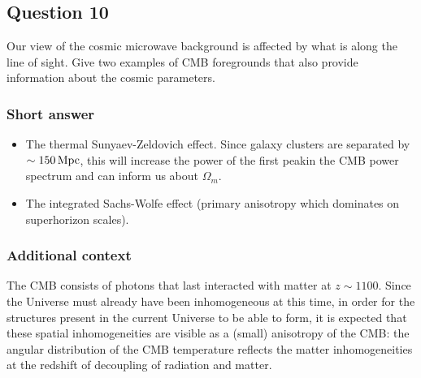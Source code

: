\documentclass[a4paper,11pt]{article}
\begin{document}
%
%

\newpage
\subsection{Question 10}

Our view of the cosmic microwave background is affected by what is along the line of sight. Give two examples of CMB foregrounds that also provide information about the cosmic parameters.

\subsubsection{Short answer}

\begin{itemize}
    \item The thermal Sunyaev-Zeldovich effect. Since galaxy clusters are separated by $\sim150\,{\rm Mpc}$, this will increase the power of the first peakin the CMB power spectrum and can inform us about $\Omega_m$.
    \item The integrated Sachs-Wolfe effect (primary anisotropy which dominates on superhorizon scales).
\end{itemize}

\subsubsection{Additional context}

{\noindent}The CMB consists of photons that last interacted with matter at $z\sim1100$. Since the Universe must already have been inhomogeneous at this time, in order for the structures present in the current Universe to be able to form, it is expected that these spatial inhomogeneities are visible as a (small) anisotropy of the CMB: the angular distribution of the CMB temperature reflects the matter inhomogeneities at the redshift of decoupling of radiation and matter.
\end{document}
